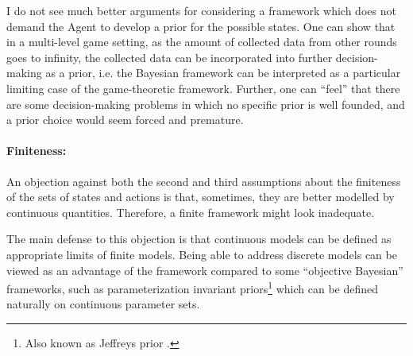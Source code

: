 \documentclass{article}
\begin{document}
I do not see much better arguments for considering a framework which does not demand the Agent to develop a prior for the possible states. One can show that in a multi-level game setting, as the amount of collected data from other rounds goes to infinity, the collected data can be incorporated into further decision-making as a prior, i.e. the Bayesian framework can be interpreted as a particular limiting case of the game-theoretic framework. Further, one can ``feel'' that there are some decision-making problems in which no specific prior is well founded, and a prior choice would seem forced and premature.

\paragraph{Finiteness:}
An objection against both the second and third assumptions about the finiteness of the sets of states and actions is that, sometimes, they are better modelled by continuous quantities. Therefore, a finite framework might look inadequate.

The main defense to this objection is that continuous models can be defined as appropriate limits of finite models. Being able to address discrete models can be viewed as an advantage of the framework compared to some ``objective Bayesian'' frameworks, such as parameterization invariant priors\footnote{Also known as Jeffreys prior \cite{book:Jaynes,paper:JeffreysPriorOriginal}.} which can be defined naturally on continuous parameter sets.
\end{document}
